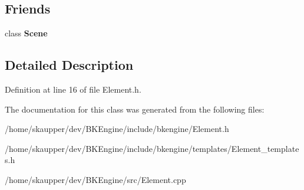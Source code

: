 \subsection*{Friends}
\begin{DoxyCompactItemize}
\item 
\mbox{\label{classbkengine_1_1Element_a032858ae1fe02d2d1170981c2af2d67c}} 
class {\bfseries Scene}
\end{DoxyCompactItemize}


\subsection{Detailed Description}


Definition at line 16 of file Element.\+h.



The documentation for this class was generated from the following files\+:\begin{DoxyCompactItemize}
\item 
/home/skaupper/dev/\+B\+K\+Engine/include/bkengine/Element.\+h\item 
/home/skaupper/dev/\+B\+K\+Engine/include/bkengine/templates/Element\+\_\+templates.\+h\item 
/home/skaupper/dev/\+B\+K\+Engine/src/Element.\+cpp\end{DoxyCompactItemize}

